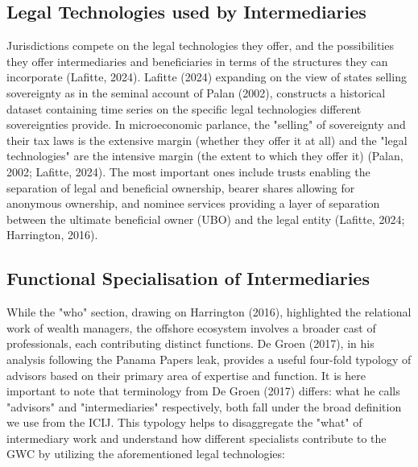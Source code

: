 \subsection{Legal Technologies used by Intermediaries}

Jurisdictions compete on the legal technologies they offer, and the possibilities they offer intermediaries and beneficiaries in terms of the structures they can incorporate (Lafitte, 2024). Lafitte (2024) expanding on the view of states selling sovereignty as in the seminal account of Palan (2002), constructs a historical dataset containing time series on the specific legal technologies different sovereignties provide. In microeconomic parlance, the "selling" of sovereignty and their tax laws is the extensive margin (whether they offer it at all) and the "legal technologies" are the intensive margin (the extent to which they offer it) (Palan, 2002; Lafitte, 2024). The most important ones include trusts enabling the separation of legal and beneficial ownership, bearer shares allowing for anonymous ownership, and nominee services providing a layer of separation between the ultimate beneficial owner (UBO) and the legal entity (Lafitte, 2024; Harrington, 2016). 

\subsection{Functional Specialisation of Intermediaries}

While the "who" section, drawing on Harrington (2016), highlighted the relational work of wealth managers, the offshore ecosystem involves a broader cast of professionals, each contributing distinct functions. De Groen (2017), in his analysis following the Panama Papers leak, provides a useful four-fold typology of advisors based on their primary area of expertise and function. It is here important to note that terminology from De Groen (2017) differs: what he calls "advisors" and "intermediaries" respectively, both fall under the broad definition we use from the ICIJ. This typology helps to disaggregate the "what" of intermediary work and understand how different specialists contribute to the GWC by utilizing the aforementioned legal technologies:

